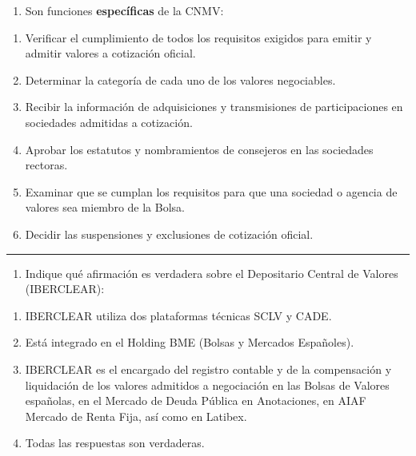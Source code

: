 \documentclass[
  letterpaper,
  DIV=11,
  numbers=noendperiod]{scrreprt}
\providecommand{\tightlist}{%
  \setlength{\itemsep}{0pt}\setlength{\parskip}{0pt}}\usepackage{longtable,booktabs,array}
\begin{document}
\begin{tcolorbox}[enhanced jigsaw, left=2mm, opacityback=0, colback=white, breakable, arc=.35mm, bottomrule=.15mm, rightrule=.15mm, toprule=.15mm, leftrule=.75mm, colframe=quarto-callout-tip-color-frame]
\begin{minipage}[t]{\textwidth - 5.5mm}
\begin{enumerate}
\def\labelenumi{\arabic{enumi}.}
\setcounter{enumi}{1}
\tightlist
\item
  Son funciones \textbf{específicas} de la CNMV:
\end{enumerate}

\begin{enumerate}
\def\labelenumi{\alph{enumi})}
\item
  Verificar el cumplimiento de todos los requisitos exigidos para emitir
  y admitir valores a cotización oficial.
\item
  Determinar la categoría de cada uno de los valores negociables.
\item
  Recibir la información de adquisiciones y transmisiones de
  participaciones en sociedades admitidas a cotización.
\item
  Aprobar los estatutos y nombramientos de consejeros en las sociedades
  rectoras.
\item
  Examinar que se cumplan los requisitos para que una sociedad o agencia
  de valores sea miembro de la Bolsa.
\item
  Decidir las suspensiones y exclusiones de cotización oficial.
\end{enumerate}

\end{minipage}%
\end{tcolorbox}

\begin{center}\rule{0.5\linewidth}{0.5pt}\end{center}

\begin{enumerate}
\def\labelenumi{\arabic{enumi}.}
\setcounter{enumi}{12}
\tightlist
\item
  Indique qué afirmación es verdadera sobre el Depositario Central de
  Valores (IBERCLEAR):
\end{enumerate}

\begin{enumerate}
\def\labelenumi{\alph{enumi})}
\item
  IBERCLEAR utiliza dos plataformas técnicas SCLV y CADE.
\item
  Está integrado en el Holding BME (Bolsas y Mercados Españoles).
\item
  IBERCLEAR es el encargado del registro contable y de la compensación y
  liquidación de los valores admitidos a negociación en las Bolsas de
  Valores españolas, en el Mercado de Deuda Pública en Anotaciones, en
  AIAF Mercado de Renta Fija, así como en Latibex.
\item
  Todas las respuestas son verdaderas.
\end{enumerate}
\end{document}
